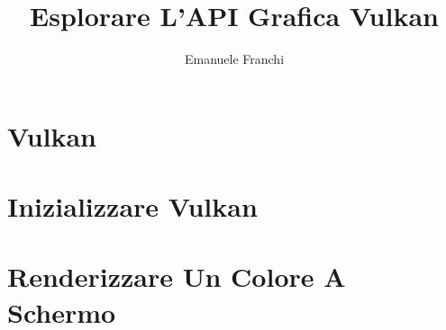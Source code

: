 \documentclass{beamer}
\title{Esplorare L'API Grafica Vulkan}
\author{Emanuele Franchi}
\date{}
\begin{document}


\section{Vulkan}





\section{Inizializzare Vulkan}






\section{Renderizzare Un Colore A Schermo}







\end{document}
